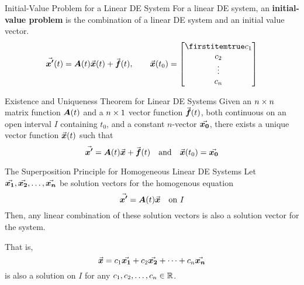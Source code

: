 \documentclass{beamer}
\begin{document}
\begin{frame}
\begin{block}{Initial-Value Problem for a Linear DE System}
For a linear DE system, an \textbf{initial-value problem} is the combination of a linear DE system and an initial value vector.
\begin{equation*}
\vect{x^\prime}(t)=\mat{A}(t)\vect{x}(t)+\vect{f}(t)
,\qquad
\vect{x}(t_0)=\bvector{c_1,c_2,\vdots,c_n}
\end{equation*}
\end{block}\pause
\begin{block}{Existence and Uniqueness Theorem for Linear DE Systems}
Given an $n\times n$ matrix function $\boldsymbol{A}(t)$ and a $n\times 1$ vector function ${\vec{\boldsymbol{f}}}(t)$, both continuous on an open interval $I$ containing $t_0$, and a constant $n$-vector ${\vec{\boldsymbol{x_0}}}$, there exists a unique vector function ${\vec{\boldsymbol{x}}}(t)$ such that
\begin{equation*}
{\vec{\boldsymbol{x^\prime}}}=\boldsymbol{A}(t){\vec{\boldsymbol{x}}}+{\vec{\boldsymbol{f}}}(t)
\quad\text{and}\quad
{\vec{\boldsymbol{x}}}(t_0)={\vec{\boldsymbol{x_0}}}
\end{equation*}
\end{block}
\end{frame}

\begin{frame}
\begin{block}{The Superposition Principle for Homogeneous Linear DE Systems}
Let ${\vec{\boldsymbol{x_1}}},{\vec{\boldsymbol{x_2}}},\ldots,{\vec{\boldsymbol{x_n}}}$ be solution vectors for the homogenous equation
\begin{equation*}
{\vec{\boldsymbol{x^\prime}}}=\boldsymbol{A}(t){\vec{\boldsymbol{x}}}
\quad\text{on $I$}
\end{equation*}
Then, any linear combination of these solution vectors is also a solution vector for the system. 

\vspace{2mm}
That is,
\begin{equation*}
{\vec{\boldsymbol{x}}}=c_1{\vec{\boldsymbol{x_1}}}+c_2{\vec{\boldsymbol{x_2}}}+\cdots+c_n{\vec{\boldsymbol{x_n}}}
\end{equation*}
is also a solution on $I$ for any $c_1,c_2,\ldots,c_n\in\mathbb{R}$.
\end{block}
\end{frame}
\end{document}
